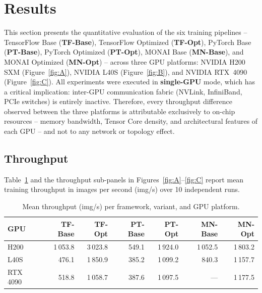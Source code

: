 
\section{Results}
\label{sec:results}

This section presents the quantitative evaluation of the six training
pipelines -- TensorFlow Base (\textbf{TF-Base}), TensorFlow Optimized
(\textbf{TF-Opt}), PyTorch Base (\textbf{PT-Base}), PyTorch Optimized
(\textbf{PT-Opt}), MONAI Base (\textbf{MN-Base}), and MONAI Optimized
(\textbf{MN-Opt}) -- across three GPU platforms: NVIDIA H200 SXM
(Figure~\ref{fig:A}), NVIDIA L40S (Figure~\ref{fig:B}), and NVIDIA
RTX~4090 (Figure~\ref{fig:C}).  All experiments were executed in
\textbf{single-GPU} mode, which has a critical implication: inter-GPU
communication fabric (NVLink, InfiniBand, PCIe switches) is entirely
inactive.  Therefore, every throughput difference observed between the
three platforms is attributable exclusively to on-chip resources --
memory bandwidth, Tensor Core density, and architectural features of
each GPU -- and not to any network or topology effect.

\subsection{Throughput}
\label{subsec:throughput}

Table~\ref{tab:throughput_summary} and the throughput sub-panels in
Figures~\ref{fig:A}--\ref{fig:C} report mean training throughput in
images per second (img/s) over 10 independent runs.

\begin{table}[h]
  \centering
  \caption{Mean throughput (img/s) per framework, variant, and GPU platform.}
  \label{tab:throughput_summary}
  \begin{tabular}{lrrrrrr}
    \hline
    \textbf{GPU} & \textbf{TF-Base} & \textbf{TF-Opt} & \textbf{PT-Base} & \textbf{PT-Opt} & \textbf{MN-Base} & \textbf{MN-Opt} \\
    \hline
    H200    & 1\,053.8 & 3\,023.8 & 549.1 & 1\,924.0 & 1\,052.5 & 1\,803.2 \\
    L40S    &   476.1  & 1\,850.9 & 385.2 & 1\,099.2 &   840.3  & 1\,157.7 \\
    RTX 4090 &  518.8  & 1\,058.7 & 387.6 & 1\,097.5 &    ---   & 1\,177.5 \\
    \hline
  \end{tabular}
\end{table}

